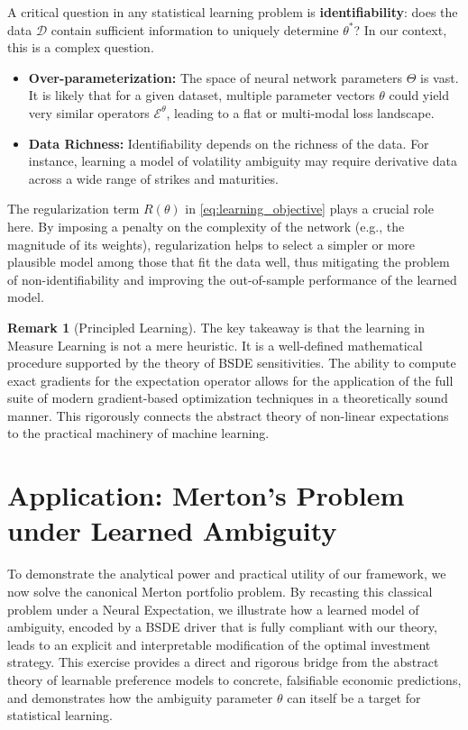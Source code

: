 \documentclass[qian]{imsart}
\newcommand{\cEneutheta}{\mathcal{E}^{\theta}}
\theoremstyle{plain}
\theoremstyle{definition}
\newtheorem{remark}[theorem]{Remark}
\begin{document}
A critical question in any statistical learning problem is \textbf{identifiability}: does the data $\mathcal{D}$ contain sufficient information to uniquely determine $\theta^*$? In our context, this is a complex question.
\begin{itemize}
    \item \textbf{Over-parameterization:} The space of neural network parameters $\Theta$ is vast. It is likely that for a given dataset, multiple parameter vectors $\theta$ could yield very similar operators $\cEneutheta$, leading to a flat or multi-modal loss landscape.
    \item \textbf{Data Richness:} Identifiability depends on the richness of the data. For instance, learning a model of volatility ambiguity may require derivative data across a wide range of strikes and maturities.
\end{itemize}
The regularization term $R(\theta)$ in \eqref{eq:learning_objective} plays a crucial role here. By imposing a penalty on the complexity of the network (e.g., the magnitude of its weights), regularization helps to select a simpler or more plausible model among those that fit the data well, thus mitigating the problem of non-identifiability and improving the out-of-sample performance of the learned model.

\begin{remark}[Principled Learning]
The key takeaway is that the learning in Measure Learning is not a mere heuristic. It is a well-defined mathematical procedure supported by the theory of BSDE sensitivities. The ability to compute exact gradients for the expectation operator allows for the application of the full suite of modern gradient-based optimization techniques in a theoretically sound manner. This rigorously connects the abstract theory of non-linear expectations to the practical machinery of machine learning.
\end{remark}

\section{Application: Merton's Problem under Learned Ambiguity}
\label{sec:merton_problem}

To demonstrate the analytical power and practical utility of our framework, we now solve the canonical Merton portfolio problem. By recasting this classical problem under a Neural Expectation, we illustrate how a learned model of ambiguity, encoded by a BSDE driver that is fully compliant with our theory, leads to an explicit and interpretable modification of the optimal investment strategy. This exercise provides a direct and rigorous bridge from the abstract theory of learnable preference models to concrete, falsifiable economic predictions, and demonstrates how the ambiguity parameter $\theta$ can itself be a target for statistical learning.
\end{document}
